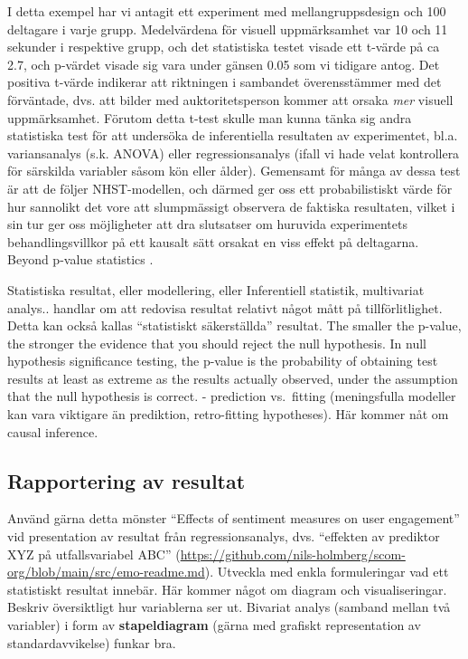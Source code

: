 \documentclass[
]{book}
\begin{document}
I detta exempel har vi antagit ett experiment med mellangruppsdesign och 100 deltagare i varje grupp. Medelvärdena för visuell uppmärksamhet var 10 och 11 sekunder i respektive grupp, och det statistiska testet visade ett t-värde på ca 2.7, och p-värdet visade sig vara under gänsen 0.05 som vi tidigare antog. Det positiva t-värde indikerar att riktningen i sambandet överensstämmer med det förväntade, dvs. att bilder med auktoritetsperson kommer att orsaka \emph{mer} visuell uppmärksamhet. Förutom detta t-test skulle man kunna tänka sig andra statistiska test för att undersöka de inferentiella resultaten av experimentet, bl.a. variansanalys (s.k. ANOVA) eller regressionsanalys (ifall vi hade velat kontrollera för särskilda variabler såsom kön eller ålder). Gemensamt för många av dessa test är att de följer NHST-modellen, och därmed ger oss ett probabilistiskt värde för hur sannolikt det vore att slumpmässigt observera de faktiska resultaten, vilket i sin tur ger oss möjligheter att dra slutsatser om huruvida experimentets behandlingsvillkor på ett kausalt sätt orsakat en viss effekt på deltagarna. Beyond p-value statistics \citep{trafimow2015editorial}.

Statistiska resultat, eller modellering, eller Inferentiell statistik, multivariat analys.. handlar om att redovisa resultat relativt något mått på tillförlitlighet. Detta kan också kallas ``statistiskt säkerställda'' resultat. The smaller the p-value, the stronger the evidence that you should reject the null hypothesis. In null hypothesis significance testing, the p-value is the probability of obtaining test results at least as extreme as the results actually observed, under the assumption that the null hypothesis is correct. - prediction vs.~fitting (meningsfulla modeller kan vara viktigare än prediktion, retro-fitting hypotheses). Här kommer nåt om causal inference.

\hypertarget{sub08.1.3}{%
\subsection{Rapportering av resultat}\label{sub08.1.3}}

Använd gärna detta mönster ``Effects of sentiment measures on user engagement'' vid presentation av resultat från regressionsanalys, dvs. ``effekten av prediktor XYZ på utfallsvariabel ABC'' (\url{https://github.com/nils-holmberg/scom-org/blob/main/src/emo-readme.md}). Utveckla med enkla formuleringar vad ett statistiskt resultat innebär. Här kommer något om diagram och visualiseringar. Beskriv översiktligt hur variablerna ser ut. Bivariat analys (samband mellan två variabler) i form av \textbf{stapeldiagram} (gärna med grafiskt representation av standardavvikelse) funkar bra.
\end{document}
